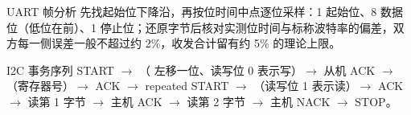 \begin{chapteranswer}{UART 帧分析}
先找起始位下降沿，再按位时间中点逐位采样：1 起始位、8 数据位（低位在前）、1 停止位；还原字节后核对实测位时间与标称波特率的偏差，双方每一侧误差一般不超过约 2\%，收发合计留有约 5\% 的理论上限。
\end{chapteranswer}

\begin{chapteranswer}{I2C 事务序列}
START $\rightarrow$ （ 左移一位、读写位 0 表示写）$\rightarrow$ 从机 ACK $\rightarrow$ （寄存器号）$\rightarrow$ ACK $\rightarrow$ repeated START $\rightarrow$ （读写位 1 表示读）$\rightarrow$ ACK $\rightarrow$ 读第 1 字节 $\rightarrow$ 主机 ACK $\rightarrow$ 读第 2 字节 $\rightarrow$ 主机 NACK $\rightarrow$ STOP。
\end{chapteranswer}
